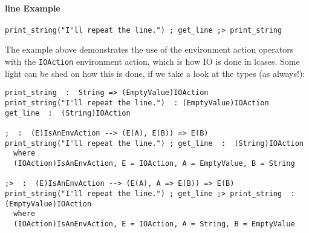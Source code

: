 \documentclass{article}
\begin{document}
\paragraph{line Example}
\begin{verbatim}
print_string("I'll repeat the line.") ; get_line ;> print_string
\end{verbatim}
The example above demonstrates the use of the environment action operators with
the \texttt{IOAction} environment action, which is how IO is done in
lcases. Some light can be shed on how this is done, if we take a look at the
types (as always!):
\begin{verbatim}
print_string  :  String => (EmptyValue)IOAction
print_string("I'll repeat the line.")  : (EmptyValue)IOAction
get_line  :  (String)IOAction

;  :  (E)IsAnEnvAction --> (E(A), E(B)) => E(B) 
print_string("I'll repeat the line.") ; get_line  :  (String)IOAction
  where
  (IOAction)IsAnEnvAction, E = IOAction, A = EmptyValue, B = String

;>  :  (E)IsAnEnvAction --> (E(A), A => E(B)) => E(B) 
print_string("I'll repeat the line.") ; get_line ;> print_string  :  (EmptyValue)IOAction
  where
  (IOAction)IsAnEnvAction, E = IOAction, A = String, B = EmptyValue
\end{verbatim}
\end{document}
